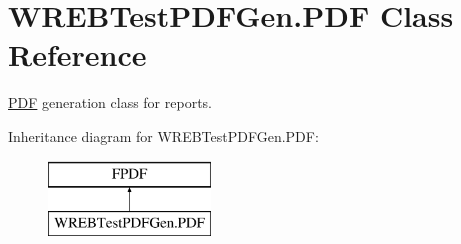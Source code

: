 \hypertarget{class_w_r_e_b_test_p_d_f_gen_1_1_p_d_f}{}\section{W\+R\+E\+B\+Test\+P\+D\+F\+Gen.\+P\+DF Class Reference}
\label{class_w_r_e_b_test_p_d_f_gen_1_1_p_d_f}


\hyperlink{class_w_r_e_b_test_p_d_f_gen_1_1_p_d_f}{P\+DF} generation class for reports.  


Inheritance diagram for W\+R\+E\+B\+Test\+P\+D\+F\+Gen.\+P\+DF\+:\begin{figure}[H]
\begin{center}
\leavevmode
\includegraphics[height=2.000000cm]{class_w_r_e_b_test_p_d_f_gen_1_1_p_d_f}
\end{center}
\end{figure}
